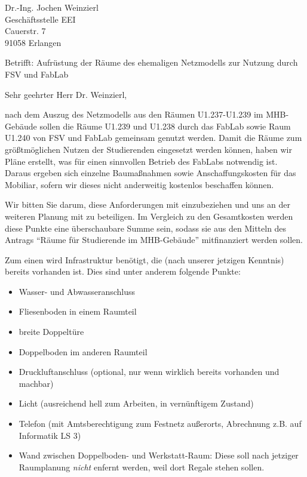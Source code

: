 \documentclass[a4paper,german]{letter}
\begin{document}
\begin{letter}{Dr.-Ing. Jochen Weinzierl\\ Geschäftsstelle EEI\\ Cauerstr. 7\\ 91058 Erlangen}
\thispagestyle{fancy}
\bigskip
{}
\opening{Betrifft: Aufrüstung der Räume des ehemaligen Netzmodells zur Nutzung durch FSV und FabLab}
\smallskip

\thispagestyle{fancy} %
Sehr geehrter Herr Dr. Weinzierl,

nach dem Auszug des Netzmodells aus den Räumen U1.237-U1.239 im MHB-Gebäude sollen die Räume U1.239 und U1.238 durch das FabLab sowie Raum U1.240 von FSV und FabLab gemeinsam genutzt werden. %
Damit die Räume zum größtmöglichen Nutzen der Studierenden eingesetzt werden können, haben wir Pläne erstellt, was für einen sinnvollen Betrieb des FabLabs notwendig ist. Daraus ergeben sich einzelne Baumaßnahmen sowie Anschaffungskosten für das Mobiliar, sofern wir dieses nicht anderweitig kostenlos beschaffen können.

Wir bitten Sie darum, diese Anforderungen mit einzubeziehen und uns an der weiteren Planung mit zu beteiligen. Im Vergleich zu den Gesamtkosten werden diese Punkte eine überschaubare Summe sein, sodass sie aus den Mitteln des Antrags \enquote{Räume für Studierende im MHB-Gebäude} mitfinanziert werden sollen.

Zum einen wird Infrastruktur benötigt, die (nach unserer jetzigen Kenntnis) bereits vorhanden ist. Dies sind unter anderem folgende Punkte:
\begin{itemize}
  \item Wasser- und Abwasseranschluss
  \item Fliesenboden in einem Raumteil
  \item breite Doppeltüre
  \item Doppelboden im anderen Raumteil
  \item Druckluftanschluss (optional, nur wenn wirklich bereits vorhanden und machbar)
  \item Licht (ausreichend hell zum Arbeiten, in vernünftigem Zustand)
  \item Telefon (mit Amtsberechtigung zum Festnetz außerorts, Abrechnung z.B. auf Informatik LS 3)
  \item Wand zwischen Doppelboden- und Werkstatt-Raum: Diese soll nach jetziger Raumplanung \emph{nicht} enfernt werden, weil dort Regale stehen sollen.
\end{itemize}


\end{letter}
\end{document}
